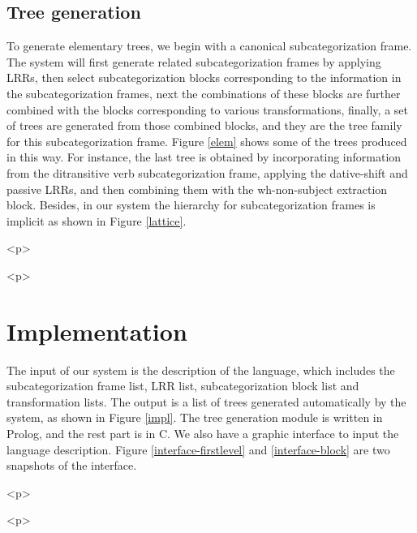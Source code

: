 
 
\subsection{Tree generation} 
To generate elementary trees, 
 we begin with a canonical subcategorization frame. 
The system will first generate 
related subcategorization frames 
by applying LRRs, then select 
subcategorization blocks corresponding to the information in 
the subcategorization frames, next 
the combinations of these blocks 
are further combined with the blocks corresponding to 
 various transformations, finally,  a set of trees are generated 
from those combined blocks, and they are 
the tree family for this subcategorization frame. 
Figure \ref{elem} shows some 
of the trees produced in this way.  For instance, the last tree is obtained by 
incorporating information from the ditransitive verb subcategorization frame, 
applying the dative-shift and passive LRRs, and then combining them with the 
wh-non-subject extraction block. 
Besides, in our system the hierarchy for subcategorization frames is implicit 
as shown in Figure \ref{lattice}. 
 
\begin{rawhtml} <p> \end{rawhtml}
\centerline{} 
\begin{rawhtml} <dl> <dt>{Partial inheritance lattice in English <p> </dl> \end{rawhtml}
\label{lattice} 
\begin{rawhtml} <p> \end{rawhtml}
 
 
 
 
\section{Implementation} 
 
The input of our system is the description of the language, which includes 
the subcategorization frame list, LRR list, subcategorization block 
list and transformation lists. The output  is a list of 
trees generated automatically by the system, as shown in Figure 
\ref{impl}. The tree generation module is written in Prolog, and 
the rest part is in C. We also have a graphic interface to input 
the language description. Figure \ref{interface-firstlevel} and 
\ref{interface-block} are two snapshots of the interface. 
 
\begin{rawhtml} <p> \end{rawhtml}
\centerline{} 
\begin{rawhtml} <dl> <dt>{Implementation of the system <p> </dl> \end{rawhtml}
\label{impl} 
\begin{rawhtml} <p> \end{rawhtml}
 
